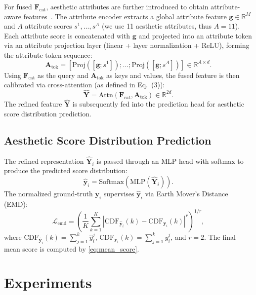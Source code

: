 \documentclass[journal]{IEEEtran}
\begin{document}
For fused $\mathbf{F}_{\mathrm{cat}}$, aesthetic attributes are further introduced to obtain attribute-aware features~\cite{kong2016parn,dhar2011high,celona2022composition}. The attribute encoder extracts a global attribute feature $\mathbf{g}\in\mathbb{R}^{M}$ and $A$ attribute scores $s^1,\ldots,s^A$ (we use 11 aesthetic attributes, thus $A=11$). Each attribute score is concatenated with $\mathbf{g}$ and projected into an attribute token via an attribute projection layer (linear + layer normalization + ReLU), forming the attribute token sequence:
\begin{equation}
\mathbf{A}_{\mathrm{tok}}=
[\mathrm{Proj}([\mathbf{g};s^1]);\ldots;\mathrm{Proj}([\mathbf{g};s^A])]
\in\mathbb{R}^{A\times d}.
\end{equation}
Using $\mathbf{F}_{\mathrm{cat}}$ as the query and $\mathbf{A}_{\mathrm{tok}}$ as keys and values, the fused feature is then calibrated via cross-attention (as defined in Eq.~(3)):
\begin{equation}
\hat{\mathbf{Y}}=\mathrm{Attn}(\mathbf{F}_{\mathrm{cat}},\mathbf{A}_{\mathrm{tok}})\in\mathbb{R}^{2d}.
\end{equation}
The refined feature $\hat{\mathbf{Y}}$ is subsequently fed into the prediction head for aesthetic score distribution prediction.

\subsection{Aesthetic Score Distribution Prediction}

The refined representation $\hat{\mathbf{Y}}_i$ is passed through an MLP head with softmax to produce the predicted score distribution:
\begin{equation}
\hat{\mathbf{y}}_i=\mathrm{Softmax}(\mathrm{MLP}(\hat{\mathbf{Y}}_i)).
\end{equation}
The normalized ground-truth $\mathbf{y}_i$ supervises $\hat{\mathbf{y}}_i$ via Earth Mover's Distance (EMD):
\begin{equation}
\mathcal{L}_{\mathrm{emd}} =
\left(
\frac{1}{K}\sum_{k=1}^{K}
\left|
\mathrm{CDF}_{\hat{\mathbf{y}}_i}(k)-
\mathrm{CDF}_{\mathbf{y}_i}(k)
\right|^r
\right)^{1/r},
\end{equation}
where $\mathrm{CDF}_{\hat{\mathbf{y}}_i}(k)=\sum_{j=1}^{k}\hat{y}_i^j$, $\mathrm{CDF}_{\mathbf{y}_i}(k)=\sum_{j=1}^{k}y_i^j$, and $r=2$. The final mean score is computed by \eqref{eq:mean_score}.

\section{Experiments}
\label{sec:experiments}
\end{document}
